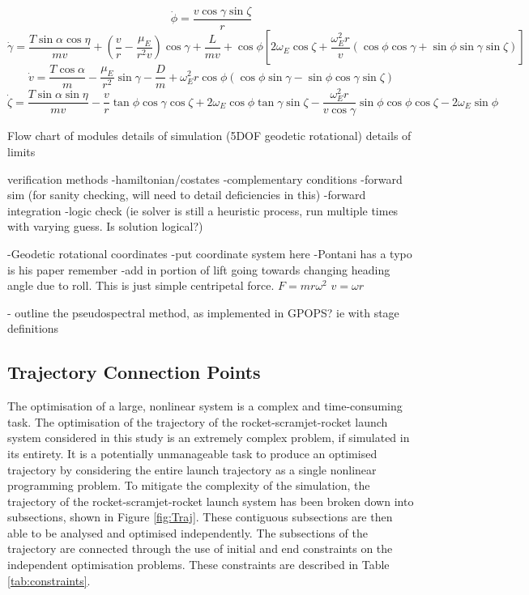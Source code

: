 \begin{equation}
\dot{\phi} = \frac{v\cos\gamma\sin\zeta}{r}
\end{equation}
\begin{equation}
\dot{\gamma} = \frac{T\sin\alpha \cos\eta}{mv} + (\frac{v}{r}-\frac{\mu_E}{r^2 v})\cos\gamma + \frac{L}{mv}
+ \cos\phi[2\omega_E \cos\zeta + \frac{\omega_E^2 r}{v}(\cos\phi\cos\gamma+\sin\phi\sin\gamma\sin\zeta)]
\end{equation}
\begin{equation}
\dot{v} = \frac{T\cos\alpha}{m}-\frac{\mu_E}{r^2}\sin\gamma - \frac{D}{m}
+ \omega_E^2 r\cos\phi(\cos\phi\sin\gamma-\sin\phi\cos\gamma\sin\zeta)
\end{equation}
\begin{equation}
\dot{\zeta} = \frac{T\sin\alpha \sin\eta}{mv}-\frac{v}{r}\tan\phi\cos\gamma\cos\zeta +2\omega_E\cos\phi\tan\gamma\sin\zeta - \frac{\omega_E^2 r}{v\cos\gamma}\sin\phi\cos\phi\cos\zeta-2\omega_E\sin\phi 
\end{equation}



	Flow chart of modules
	details of simulation (5DOF geodetic rotational)
	details of limits
	
	verification methods
	-hamiltonian/costates
	-complementary conditions
	-forward sim (for sanity checking, will need to detail deficiencies in this)
	-forward integration
	-logic check (ie solver is still a heuristic process, run multiple times with varying guess. Is solution logical?)

-Geodetic rotational coordinates 
-put coordinate system here
-Pontani has a typo is his paper remember
-add in portion of lift going towards changing heading angle due to roll. This is just simple centripetal force. 
$F=mr\omega^2$ $v=\omega r$



- outline the pseudospectral method, as implemented in GPOPS? ie with stage definitions

\subsection{Trajectory Connection Points}

The optimisation of a large, nonlinear system is a complex and time-consuming task. The optimisation of the trajectory of the rocket-scramjet-rocket launch system considered in this study is an extremely complex problem, if simulated in its entirety. It is a potentially unmanageable task to produce an optimised trajectory by considering the entire launch trajectory as a single nonlinear programming problem. 
To mitigate the complexity of the simulation, the trajectory of the rocket-scramjet-rocket launch system has been broken down into subsections, shown in Figure \ref{fig:Traj}. These contiguous subsections are then able to be analysed and optimised independently. The subsections of the trajectory are connected through the use of initial and end constraints on the independent optimisation problems. These constraints are described in Table \ref{tab:constraints}.

